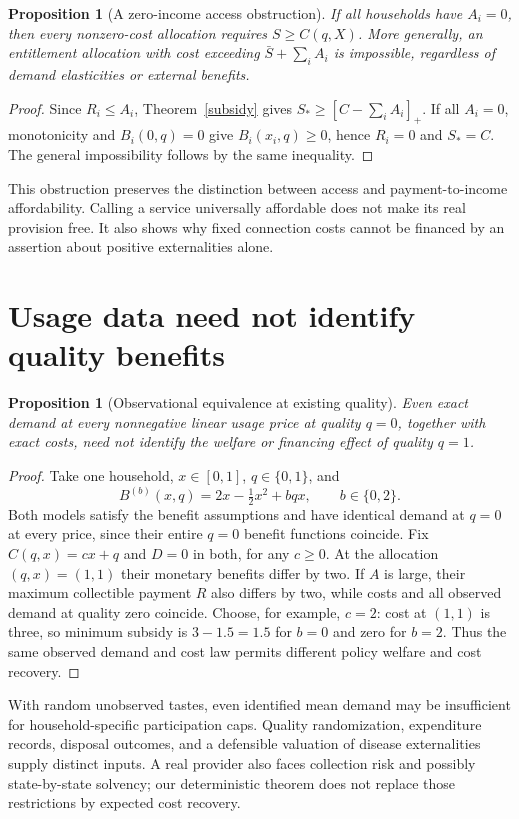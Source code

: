 \documentclass[11pt]{article}
\newtheorem{proposition}[theorem]{Proposition}
\theoremstyle{remark}
\begin{document}
\begin{proposition}[A zero-income access obstruction]
If all households have $A_i=0$, then every nonzero-cost allocation requires $S\geq C(q,X)$. More generally, an entitlement allocation with cost exceeding $\bar S+\sum_iA_i$ is impossible, regardless of demand elasticities or external benefits.
\end{proposition}
\begin{proof}
Since $R_i\leq A_i$, Theorem~\ref{subsidy} gives
$S_*\geq[C-\sum_iA_i]_+$. If all $A_i=0$, monotonicity and $B_i(0,q)=0$ give $B_i(x_i,q)\geq0$, hence $R_i=0$ and $S_*=C$. The general impossibility follows by the same inequality.
\end{proof}

This obstruction preserves the distinction between access and payment-to-income affordability. Calling a service universally affordable does not make its real provision free. It also shows why fixed connection costs cannot be financed by an assertion about positive externalities alone.

\section{Usage data need not identify quality benefits}
\begin{proposition}[Observational equivalence at existing quality]
Even exact demand at every nonnegative linear usage price at quality $q=0$, together with exact costs, need not identify the welfare or financing effect of quality $q=1$.
\end{proposition}
\begin{proof}
Take one household, $x\in[0,1]$, $q\in\{0,1\}$, and
\[
 B^{(b)}(x,q)=2x-\tfrac12x^2+bqx,\qquad b\in\{0,2\}.
\]
Both models satisfy the benefit assumptions and have identical demand at $q=0$ at every price, since their entire $q=0$ benefit functions coincide. Fix $C(q,x)=c x+q$ and $D=0$ in both, for any $c\geq0$. At the allocation $(q,x)=(1,1)$ their monetary benefits differ by two. If $A$ is large, their maximum collectible payment $R$ also differs by two, while costs and all observed demand at quality zero coincide. Choose, for example, $c=2$: cost at $(1,1)$ is three, so minimum subsidy is $3-1.5=1.5$ for $b=0$ and zero for $b=2$. Thus the same observed demand and cost law permits different policy welfare and cost recovery.
\end{proof}

With random unobserved tastes, even identified mean demand may be insufficient for household-specific participation caps. Quality randomization, expenditure records, disposal outcomes, and a defensible valuation of disease externalities supply distinct inputs. A real provider also faces collection risk and possibly state-by-state solvency; our deterministic theorem does not replace those restrictions by expected cost recovery.
\end{document}
